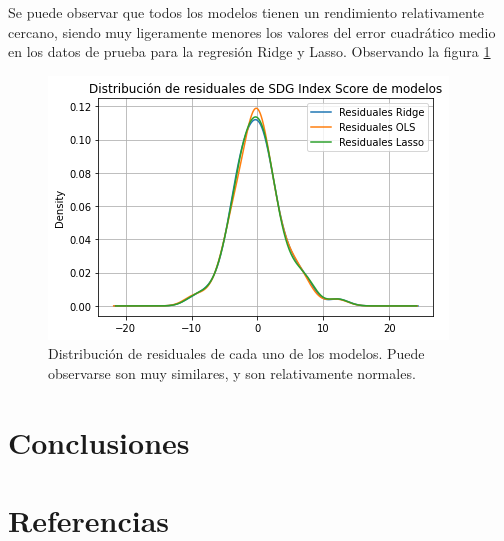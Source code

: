 \documentclass[a4paper,12pt]{amsart}
\begin{document}
    Se puede observar que todos los modelos tienen un rendimiento relativamente cercano, 
    siendo muy ligeramente menores los valores del error cuadrático medio en los 
    datos de prueba para la regresión Ridge y Lasso. Observando la figura \ref{fig:residuals}
    \begin{figure}
        \centering
        \includegraphics[width=0.8\linewidth]{Images/Residuals.png}
        \caption{Distribución de residuales de cada uno de los modelos. Puede observarse son muy similares, y son relativamente normales.}\label{fig:residuals}
    \end{figure}

    \section{Conclusiones}

    \section{Referencias}
    \printbibliography
\end{document}
